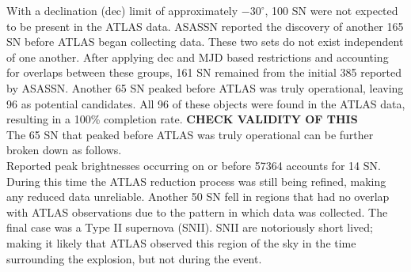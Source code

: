 \indent With a declination (dec) limit of approximately $-30^{\circ}$, 100 SN were not 
expected to be present in the ATLAS data.
ASASSN reported the discovery of another 165 SN before ATLAS began collecting data. 
These two sets do not exist independent of one another. 
After applying dec and MJD based restrictions and accounting for overlaps between 
these groups, 161 SN remained from the initial 385 reported by ASASSN. 
Another 65 SN peaked before ATLAS was truly operational, leaving 96 as potential candidates.
All 96 of these objects were found in the ATLAS data, resulting in a 100\% completion rate.
{\bf CHECK VALIDITY OF THIS}\\
\indent The 65 SN that peaked before ATLAS was truly operational can be further broken down as follows.\\
Reported peak brightnesses occurring on or before 57364 accounts for 14 SN. 
During this time the ATLAS reduction process was still being refined, making 
any reduced data unreliable.
Another 50 SN fell in regions that had no overlap with ATLAS observations due 
to the pattern in which data was collected.
The final case was a Type II supernova (SNII).
SNII are notoriously short lived; making it likely that ATLAS observed this region of the sky in the 
time surrounding the explosion, but not during the event.




